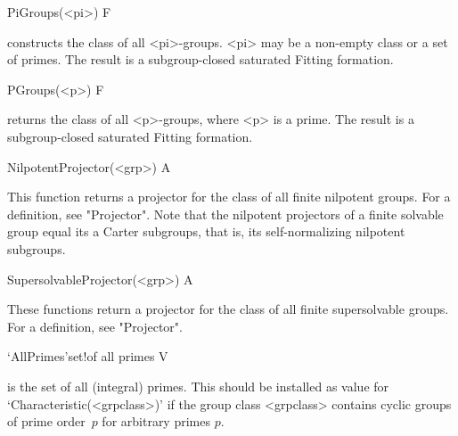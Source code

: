 \>PiGroups(<pi>) F

constructs the class of all <pi>-groups.  <pi> may be a non-empty class or a
set of primes. The result is a subgroup-closed saturated Fitting formation.


\>PGroups(<p>) F

returns the class of all <p>-groups, where <p> is a prime.  The result is a
subgroup-closed saturated Fitting formation.

\null

\>NilpotentProjector(<grp>) A

%
This function returns a projector for the class of all finite nilpotent
groups. For a definition, see "Projector". Note that the nilpotent projectors
of a finite solvable group equal its a Carter subgroups, that is, its
self-normalizing nilpotent subgroups. 

\>SupersolvableProjector(<grp>) A

These functions return a projector for the class of all finite supersolvable
groups. For a definition, see "Projector". 

\null

\>`AllPrimes'{set}!{of all primes} V

%
\label{AllPrimes}%
is the set of all (integral) primes. This should be
installed as value for `Characteristic(<grpclass>)' if the group class
<grpclass> contains cyclic groups of prime order~$p$ for arbitrary primes $p$.




